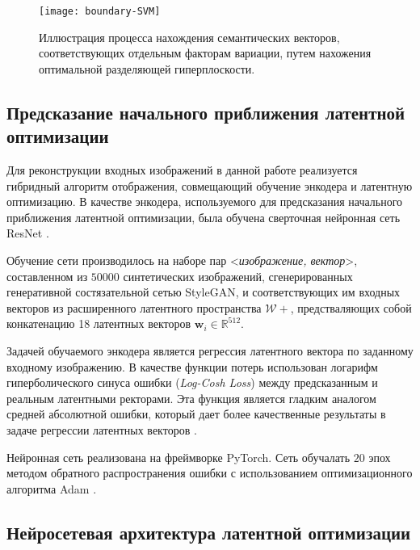 \begin{figure}[h]
\begin{center}
    \texttt{[image: boundary-SVM]}
    \caption{Иллюстрация процесса нахождения семантических векторов, соответствующих отдельным факторам вариации, путем нахожения оптимальной разделяющей гиперплоскости.}
    \label{fig:svm-boundary}
\end{center}
\end{figure}


\subsection{Предсказание начального приближения латентной оптимизации}

Для реконструкции входных изображений в данной работе реализуется гибридный алгоритм отображения, совмещающий обучение энкодера и латентную оптимизацию.
В качестве энкодера, используемого для предсказания начального приближения латентной оптимизации, была обучена сверточная нейронная сеть ResNet \cite{he2016resnet}.

Обучение сети производилось на наборе пар <\emph{изображение, вектор}>, составленном из $50000$ синтетических изображений, сгенерированных генеративной состязательной сетью StyleGAN, и соответствующих им входных векторов из расширенного латентного пространства $\mathcal W+$, предстваляющих собой конкатенацию 18 латентных векторов $\mathbf w_i \in \mathbb R^{512}$.

Задачей обучаемого энкодера является регрессия латентного вектора по заданному входному изображению.
В качестве функции потерь использован логарифм гиперболического синуса ошибки (\emph{Log-Cosh Loss}) между предсказанным и реальным латентными ректорами. Эта функция является гладким аналогом средней абсолютной ошибки, который дает более качественные результаты в задаче регрессии латентных векторов \cite{chen2019log}.

Нейронная сеть реализована на фреймворке PyTorch. Сеть обучалать $20$ эпох методом обратного распространения ошибки с использованием оптимизационного алгоритма Adam \cite{kingma2014adam}.



\subsection{Нейросетевая архитектура латентной оптимизации}


